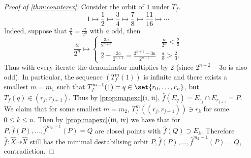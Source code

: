 \documentclass[11pt, final]{amsart}
\newcommand{\dashto}{\dashrightarrow}
\begin{document}
\begin{proof}[Proof of \autoref{thm:counterex}]

Consider the orbit of $1$ under $T_f$.%
\[1 \mapsto \frac 12 \mapsto \frac 34 \mapsto \frac 78 \mapsto \frac{11}{16} \mapsto \cdots\]
Indeed, suppose that $\frac ab = \frac a{2^n}$ with $a$ odd, then
\[\frac a{2^n} \longmapsto
\begin{cases}
 \frac {3a}{2^{n+1}} & \frac a{2^n} < \frac 23\\
 2 - \frac {3a}{2^{n+1}} = \frac{2^{n+2} - 3a}{2^{n+1}} & \frac ab > \frac 23.
\end{cases}
\]
Thus with every iterate the denominator multiplies by $2$ (since $2^{n+2} -3a$ is also odd). 
%
In particular, the sequence $(T_f^m(1))$ is infinite and there exists a smallest $m = m_1$ such that $T_f^{m-1}(1) = q \in \set{r_0, \dots, r_n}$, but $T_f(q) \in (r_j, r_{j+1})$. Thus by \autoref{prop:mapexc}(i, ii), $\hat f(E_q) = E_{r_j} \cap E_{r_{j+1}} = P$. %
 We claim that for some smallest $m = m_2$, $T_f^m((r_j, r_{j+1})) \ni r_k$ for some $0 \le k \le n$. Then by \autoref{prop:mapexc}(iii, iv) we have that for $P, \hat f(P), \dots, \hat f^{m_2-1}(P) = Q$ are closed points with $\hat f(Q) \supset E_k$. Therefore $\hat f : \hat X \dashto \hat X$ still has the minimal destabilising orbit $P, \hat f(P), \dots, \hat f^{m_2-1}(P) = Q$, contradiction.


\end{proof}
\end{document}

